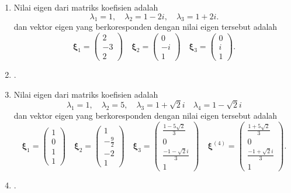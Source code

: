 \documentclass[a4paper]{article}
\theoremstyle{definisi}
\newcommand{\bfxi}{\boldsymbol{\xi}}
\numberwithin{equation}{section}
\begin{document}
\begin{enumerate}
    \item Nilai eigen dari matriks koefisien adalah
    \[\lambda_1 = 1, \quad \lambda_2 = 1 -2i, \quad \lambda_3 = 1 + 2i.\]
    dan vektor eigen yang berkoresponden dengan nilai eigen tersebut adalah
    \[\bfxi_1 = \begin{pmatrix}2\\-3\\2\end{pmatrix} \quad \bfxi_2 = \begin{pmatrix}0\\-i\\1\end{pmatrix} \quad \bfxi_3 = \begin{pmatrix}0\\i\\1\end{pmatrix}.\]
    \item .
    \item Nilai eigen dari matriks koefisien adalah
    \[\lambda_1 = 1, \quad \lambda_2 = 5, \quad \lambda_3 = 1 + \sqrt{2}i \quad \lambda_4 = 1 - \sqrt{2}i\]
    dan vektor eigen yang berkoresponden dengan nilai eigen tersebut adalah
    \[\bfxi_1 = \begin{pmatrix}1\\0\\1\\1\end{pmatrix} \quad \bfxi_2 = \begin{pmatrix}1\\-\frac{9}{2}\\-2\\1\end{pmatrix} \quad \bfxi_3 = \begin{pmatrix}\frac{1-5\sqrt{2}}{3}\\0\\\frac{-1-\sqrt{2}i}{3}\\1\end{pmatrix} \quad \bfxi^{(4)} = \begin{pmatrix}\frac{1+5\sqrt{2}}{3}\\0\\\frac{-1+\sqrt{2}i}{3}\\1\end{pmatrix}.\]
    \item .
  \end{enumerate}
\end{document}
